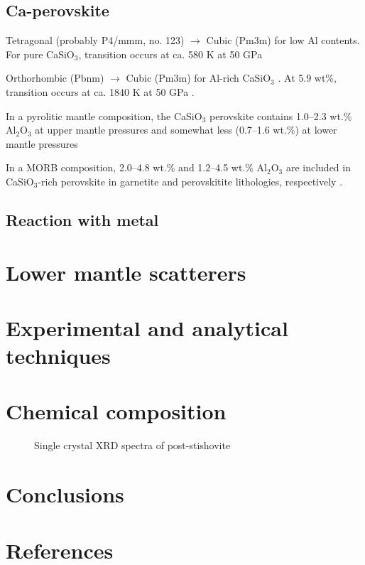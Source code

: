 \documentclass[review]{elsarticle}
\begin{document}
\subsection{Ca-perovskite}
Tetragonal (probably P4/mmm, no. 123) \citep{SJD2002} $\rightarrow$ Cubic (Pm3m) for low Al contents. For pure CaSiO$_3$, transition occurs at ca. 580 K at 50 GPa \citep{KHOSO2004, KHSOD2007}

Orthorhombic (Pbnm) $\rightarrow$ Cubic (Pm3m) for Al-rich CaSiO$_3$ \citep{KHOSO2004}. At 5.9 wt\%, transition occurs at ca. 1840 K at 50 GPa \citep{KHOSO2004}.

 In a pyrolitic mantle composition, the CaSiO$_3$ perovskite contains 1.0--2.3 wt.\% Al$_2$O$_3$ at upper mantle pressures and somewhat less (0.7--1.6 wt.\%) at lower mantle pressures \citep{KFS1998, Wood2000, Hirose2002}

 In a MORB composition, 2.0--4.8 wt.\% and 1.2--4.5 wt.\% Al$_2$O$_3$ are included in CaSiO$_3$-rich perovskite in garnetite and perovskitite lithologies, respectively \citep{KFS1994, IR1993, HF2002}.


\subsection{Reaction with metal}
\citep{Terasakietal2012}

\section{Lower mantle scatterers}
\cite{DAD2013}
\cite{KH1998,KH2003}
\cite{NKF2003}
\cite{KBSW2001}
\cite{Kaneshima2009}
\cite{BSBIWJ2010}
\cite{KHSBIWJ2010}
\cite{BR2014}
\cite{AHOHOM2013}
\cite{Mookherjee2011}

\section{Experimental and analytical techniques}

\section{Chemical composition}
\begin{figure}[ht!]
  \centering
  \caption{Single crystal XRD spectra of post-stishovite}
  \label{fig:xrd_post_stv}
\end{figure}

\section{Conclusions}



\clearpage
\section*{References}


\end{document}
